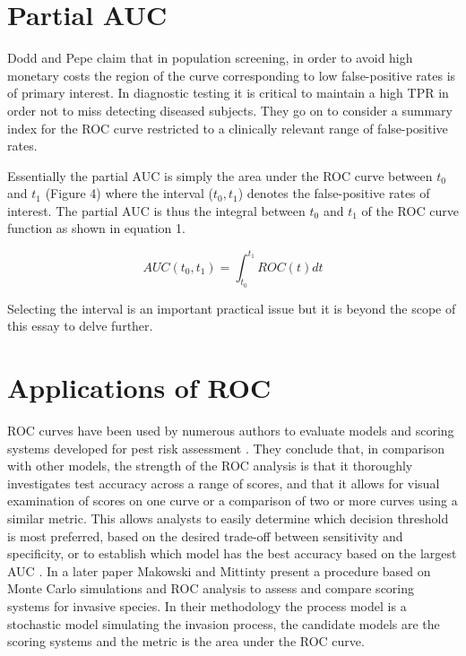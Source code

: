 \section{Partial AUC} 
Dodd and Pepe \citep{dodd2003pauc} claim that in population screening, in order to avoid high monetary costs the region of the curve corresponding to low false-positive rates is of primary interest. In diagnostic testing it is critical to maintain a high TPR in order not to miss detecting diseased subjects. They go on to consider a summary index for the ROC curve restricted to a clinically relevant range of false-positive rates.

Essentially the partial AUC is simply the area under the ROC curve between $t_{0}$ and $t_{1}$ (Figure 4) where the interval ($t_{0},t_{1}$) denotes the false-positive rates of interest. The partial AUC is thus the integral between $t_{0}$ and $t_{1}$ of the ROC curve function as shown in equation 1.

\begin{equation}\label{eq:partial-auc}
AUC(t_{0},t_{1}) = \int_{t_{0}}^{t_{1}} ROC(t)  dt
\end{equation}

Selecting the interval is an important practical issue but it is beyond the scope of this essay to delve further.

\section{Applications of ROC}
ROC curves have been used by numerous authors to evaluate models and scoring systems developed for pest risk assessment \citep{copp2009screening,heidy2010minfneginvspec}. They conclude that, in comparison with other models, the strength of the ROC analysis is that it thoroughly investigates test accuracy across a range of scores, and that it allows for visual examination of scores on one curve or a comparison of two or more curves using a similar metric. This allows analysts to easily determine which decision threshold is most preferred, based on the desired trade-off between sensitivity and specificity, or to establish which model has the best accuracy based on the largest AUC \citep{linden2006diagpreddismgmt}. In a later paper Makowski and Mittinty \citep{makowski2010scorsysinvpests} present a procedure based on Monte Carlo simulations and ROC analysis to assess and compare scoring systems for invasive species. In their methodology the process model is a stochastic model simulating the invasion process, the candidate models are the scoring systems and the metric is the area under the ROC curve.

